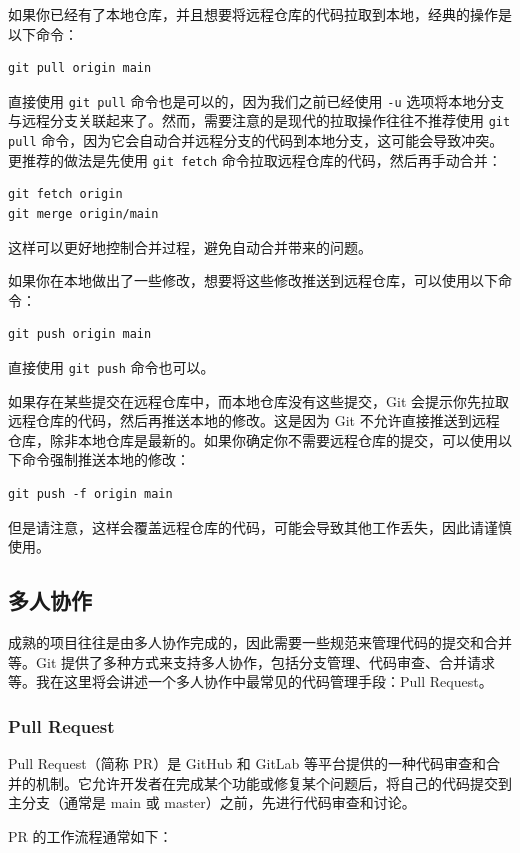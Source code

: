 \documentclass[../main.tex]{subfiles}
\begin{document}
如果你已经有了本地仓库，并且想要将远程仓库的代码拉取到本地，经典的操作是以下命令：
\begin{verbatim}
git pull origin main
\end{verbatim}
直接使用 \texttt{git pull} 命令也是可以的，因为我们之前已经使用 \texttt{-u} 选项将本地分支与远程分支关联起来了。然而，需要注意的是现代的拉取操作往往不推荐使用 \texttt{git pull} 命令，因为它会自动合并远程分支的代码到本地分支，这可能会导致冲突。更推荐的做法是先使用 \texttt{git fetch} 命令拉取远程仓库的代码，然后再手动合并：
\begin{verbatim}
git fetch origin
git merge origin/main
\end{verbatim}
这样可以更好地控制合并过程，避免自动合并带来的问题。

如果你在本地做出了一些修改，想要将这些修改推送到远程仓库，可以使用以下命令：
\begin{verbatim}
git push origin main
\end{verbatim}
直接使用 \texttt{git push} 命令也可以。

如果存在某些提交在远程仓库中，而本地仓库没有这些提交，Git 会提示你先拉取远程仓库的代码，然后再推送本地的修改。这是因为 Git 不允许直接推送到远程仓库，除非本地仓库是最新的。如果你确定你不需要远程仓库的提交，可以使用以下命令强制推送本地的修改：
\begin{verbatim}
git push -f origin main
\end{verbatim}
但是请注意，这样会覆盖远程仓库的代码，可能会导致其他工作丢失，因此请谨慎使用。

\subsection{多人协作}

成熟的项目往往是由多人协作完成的，因此需要一些规范来管理代码的提交和合并等。Git 提供了多种方式来支持多人协作，包括分支管理、代码审查、合并请求等。我在这里将会讲述一个多人协作中最常见的代码管理手段：Pull Request。

\subsubsection{Pull Request}
Pull Request（简称 PR）是 GitHub 和 GitLab 等平台提供的一种代码审查和合并的机制。它允许开发者在完成某个功能或修复某个问题后，将自己的代码提交到主分支（通常是 main 或 master）之前，先进行代码审查和讨论。

PR 的工作流程通常如下：
\end{document}
